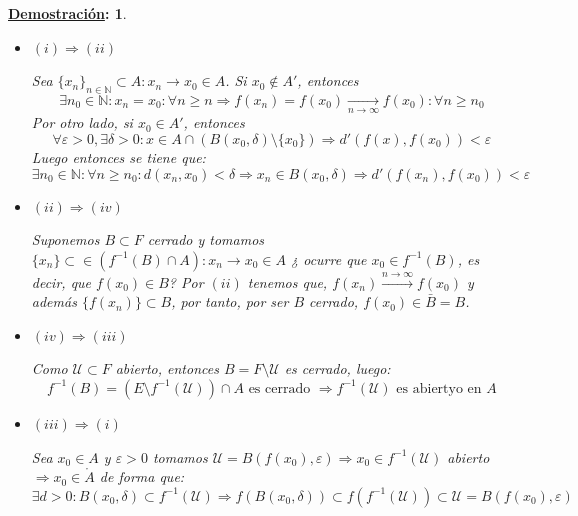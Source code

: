 \documentclass[10pt,a4paper,openright]{book}
\theoremstyle{break}
\newtheorem*{demo}{\underline{Demostración}:}
\begin{document}
\begin{demo}
\begin{itemize}
\item $(i) \Rightarrow (ii)$ 

Sea $\{x_n\}_{n \in \mathbb{N}} \subset A : x_n \to x_0 \in A$. Si $x_0 \notin A'$, entonces $$\exists n_0 \in \mathbb{N} : x_n = x_0 : \forall n \geq n \Rightarrow f(x_n) = f(x_0) \xrightarrow[n\rightarrow\infty]{} f(x_0) : \forall n \geq n_0$$
Por otro lado, si $x_0 \in A'$, entonces 
$$\forall\varepsilon > 0, \exists \delta > 0 : x \in A \cap (B(x_0, \delta) \setminus \{x_0\}) \Rightarrow d'(f(x), f(x_0)) < \varepsilon$$
Luego entonces se tiene que:
$$\exists n_0 \in \mathbb{N} : \forall n \geq n_0 : d(x_n, x_0) < \delta \Rightarrow x_n \in B(x_0, \delta) \Rightarrow d'(f(x_n), f(x_0)) < \varepsilon$$

\item $(ii) \Rightarrow (iv)$

Suponemos $B \subset F$ cerrado y tomamos $\{x_n\} \subset \in (f^{-1}(B) \cap A) : x_n \to x_0 \in A$ ¿ ocurre que $x_0 \in f^{-1}(B)$, es decir, que $f(x_0) \in B$? Por $(ii)$ tenemos que, $f(x_n) \xrightarrow{n\rightarrow\infty} f(x_0)$ y además $\{f(x_n)\} \subset B$, por tanto, por ser $B$ cerrado, $f(x_0) \in \bar{B} = B$.

\item $(iv) \Rightarrow (iii)$

Como $\mathcal{U} \subset F$ abierto, entonces $B = F \setminus \mathcal{U}$ es cerrado, luego:
$$f^{-1}(B) = (E \setminus f^{-1} (\mathcal{U})) \cap A \mbox{ es cerrado }\Rightarrow f^{-1}(\mathcal{U}) \mbox{ es abiertyo en } A$$

\item $(iii) \Rightarrow (i)$

Sea $x_0 \in A $ y $\varepsilon > 0$ tomamos $\mathcal{U} = B(f(x_0), \varepsilon) \Rightarrow x_0 \in f^{-1} (\mathcal{U})$ abierto $\Rightarrow x_0\in\mathring{A}$ de forma que:
$$\exists d > 0 : B(x_0, \delta) \subset f^{-1} (\mathcal{U}) \Rightarrow f(B(x_0, \delta)) \subset f(f^{-1} (\mathcal{U})) \subset \mathcal{U} = B(f(x_0), \varepsilon)$$ 
\end{itemize}
\end{demo}
\end{document}
